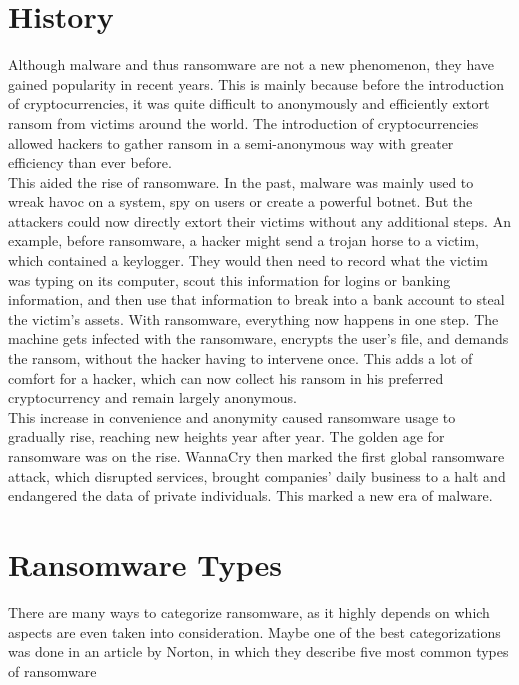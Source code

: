 \section{History}

Although malware and thus ransomware are not a new phenomenon, they have gained popularity in recent years.
This is mainly because before the introduction of cryptocurrencies, it was quite difficult to anonymously and efficiently extort ransom from victims around the world.
The introduction of cryptocurrencies allowed hackers to gather ransom in a semi-anonymous way with greater efficiency than ever before.
\\

This aided the rise of ransomware.
In the past, malware was mainly used to wreak havoc on a system, spy on users or create a powerful botnet.
But the attackers could now directly extort their victims without any additional steps.
An example, before ransomware, a hacker might send a trojan horse to a victim, which contained a keylogger.
They would then need to record what the victim was typing on its computer, scout this information for logins or banking information, and then use that information to break into a bank account to steal the victim's assets.
With ransomware, everything now happens in one step.
The machine gets infected with the ransomware, encrypts the user's file, and demands the ransom, without the hacker having to intervene once.
This adds a lot of comfort for a hacker, which can now collect his ransom in his preferred cryptocurrency and remain largely anonymous.
\\

This increase in convenience and anonymity caused ransomware usage to gradually rise, reaching new heights year after year.
The golden age for ransomware was on the rise.
WannaCry then marked the first global ransomware attack, which disrupted services, brought companies' daily business to a halt and endangered the data of private individuals.
This marked a new era of malware.
\\

\section{Ransomware Types}

There are many ways to categorize ransomware, as it highly depends on which aspects are even taken into consideration.
Maybe one of the best categorizations was done in an article by Norton, in which they describe five most common types of ransomware%
\\

